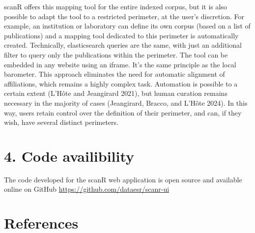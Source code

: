 \documentclass[
]{article}
\begin{document}
scanR offers this mapping tool for the entire indexed corpus, but it is
also possible to adapt the tool to a restricted perimeter, at the user's
discretion. For example, an institution or laboratory can define its own
corpus (based on a list of publications) and a mapping tool dedicated to
this perimeter is automatically created. Technically, elasticsearch
queries are the same, with just an additional filter to query only the
publications within the perimeter. The tool can be embedded in any
website using an iframe. It's the same principle as the local barometer.
This approach eliminates the need for automatic alignment of
affiliations, which remains a highly complex task. Automation is
possible to a certain extent (L'Hôte and Jeangirard 2021), but human
curation remains necessary in the majority of cases (Jeangirard, Bracco,
and L'Hôte 2024). In this way, users retain control over the definition
of their perimeter, and can, if they wish, have several distinct
perimeters.

\hypertarget{code-availibility}{%
\section{4. Code availibility}\label{code-availibility}}

The code developed for the scanR web application is open source and
available online on GitHub \url{https://github.com/dataesr/scanr-ui}

\hypertarget{references}{%
\section*{References}\label{references}}
\end{document}
